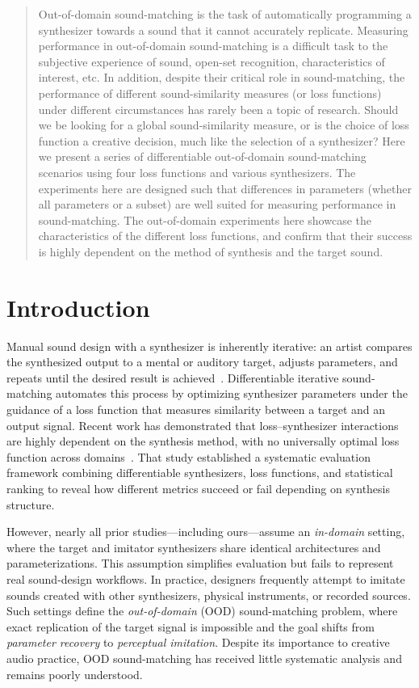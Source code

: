 \documentclass[runningheads,20pt]{llncs}
\begin{document}
\begin{abstract}
 Out-of-domain sound-matching is the task of automatically programming a synthesizer towards a sound that it cannot accurately replicate. Measuring performance in out-of-domain sound-matching is a difficult task to the subjective experience of sound, open-set recognition, characteristics of interest, etc. In addition, despite their critical role in sound-matching, the performance of different sound-similarity measures (or loss functions) under different circumstances has rarely been a topic of research. Should we be looking for a global sound-similarity measure, or is the choice of loss function a creative decision, much like the selection of a synthesizer?
 Here we present a series of differentiable out-of-domain sound-matching scenarios using four loss functions and various synthesizers. The experiments here are designed such that differences in parameters (whether all parameters or a subset) are well suited for measuring performance in sound-matching. The out-of-domain experiments here showcase the characteristics of the different loss functions, and confirm that their success is highly dependent on the method of synthesis and the target sound. 
\end{abstract}

\section{Introduction}
\label{sec:intro}
Manual sound design with a synthesizer is inherently iterative: an artist compares the synthesized output to a mental or auditory target, adjusts parameters, and repeats until the desired result is achieved~\cite{salimi2025soundmatching}.  
Differentiable iterative sound-matching automates this process by optimizing synthesizer parameters under the guidance of a loss function that measures similarity between a target and an output signal.  
Recent work has demonstrated that loss–synthesizer interactions are highly dependent on the synthesis method, with no universally optimal loss function across domains~\cite{salimi2025soundmatching}.  
That study established a systematic evaluation framework combining differentiable synthesizers, loss functions, and statistical ranking to reveal how different metrics succeed or fail depending on synthesis structure.

However, nearly all prior studies—including ours—assume an \emph{in-domain} setting, where the target and imitator synthesizers share identical architectures and parameterizations.  
This assumption simplifies evaluation but fails to represent real sound-design workflows.  
In practice, designers frequently attempt to imitate sounds created with other synthesizers, physical instruments, or recorded sources.  
Such settings define the \emph{out-of-domain} (OOD) sound-matching problem, where exact replication of the target signal is impossible and the goal shifts from \emph{parameter recovery} to \emph{perceptual imitation}.  
Despite its importance to creative audio practice, OOD sound-matching has received little systematic analysis and remains poorly understood.
\end{document}

